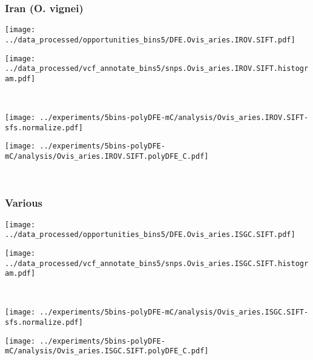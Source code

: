 \subsubsection{Iran (O. vignei)}

\begin{minipage}{0.49\linewidth}
    \texttt{[image: ../data\_processed/opportunities\_bins5/DFE.Ovis\_aries.IROV.SIFT.pdf]}
\end{minipage}
\begin{minipage}{0.49\linewidth}
    \texttt{[image: ../data\_processed/vcf\_annotate\_bins5/snps.Ovis\_aries.IROV.SIFT.histogram.pdf]}
\end{minipage}
\\
\begin{minipage}{0.49\linewidth}
    \texttt{[image: ../experiments/5bins-polyDFE-mC/analysis/Ovis\_aries.IROV.SIFT-sfs.normalize.pdf]}
\end{minipage}
\begin{minipage}{0.49\linewidth}
    \texttt{[image: ../experiments/5bins-polyDFE-mC/analysis/Ovis\_aries.IROV.SIFT.polyDFE\_C.pdf]}
\end{minipage}
\\

\subsubsection{Various}

\begin{minipage}{0.49\linewidth}
    \texttt{[image: ../data\_processed/opportunities\_bins5/DFE.Ovis\_aries.ISGC.SIFT.pdf]}
\end{minipage}
\begin{minipage}{0.49\linewidth}
    \texttt{[image: ../data\_processed/vcf\_annotate\_bins5/snps.Ovis\_aries.ISGC.SIFT.histogram.pdf]}
\end{minipage}
\\
\begin{minipage}{0.49\linewidth}
    \texttt{[image: ../experiments/5bins-polyDFE-mC/analysis/Ovis\_aries.ISGC.SIFT-sfs.normalize.pdf]}
\end{minipage}
\begin{minipage}{0.49\linewidth}
    \texttt{[image: ../experiments/5bins-polyDFE-mC/analysis/Ovis\_aries.ISGC.SIFT.polyDFE\_C.pdf]}
\end{minipage}
\\

